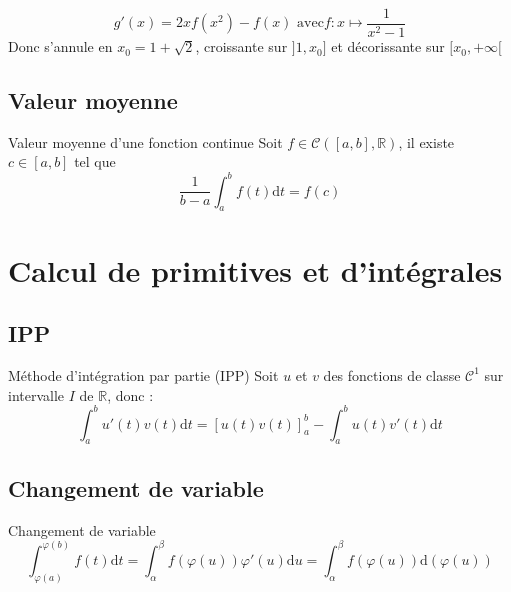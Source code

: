 \begin{myproof}{}{}
\begin{equation}
  g'(x) = 2x f(x ^{2}) - f(x) \text{ avec} f : x \mapsto \frac{1}{x ^{2} - 1} 
\end{equation}
Donc s'annule en $x_0 = 1 + \sqrt{2}$, croissante sur $]1, x_0]$ et décorissante sur $[x_0, + \infty[$
\end{myproof}

\subsection{Valeur moyenne} %
\label{sub:Valeur moyenne}

\begin{Theorem}{Valeur moyenne d'une fonction continue}{}
  Soit $f \in \mathcal{C}([a,b], \mathbb{R})$, il existe $c \in [a,b]$ tel que 
  \begin{equation}
    \frac{1}{b-a}  \int_{a}^{b} f(t) \mathrm{d}t = f(c)
  \end{equation}
\end{Theorem}


\section{Calcul de primitives et d'intégrales} %
\label{sec:Calcul de primitives et d'intégrales}

\subsection{IPP} %
\label{sub:IPP}

\begin{Prop}{Méthode d'intégration par partie (IPP)}{}
Soit $u$ et $v$ des fonctions de classe $\mathcal{C} ^{1}$ sur intervalle $I$ de $\mathbb{R}$, donc :
\begin{equation}
  \int_{a}^{b} u'(t) v(t) \mathrm{d} t = [u(t)v(t)]_a ^{b} - \int_{a}^{b} u(t)v'(t) \mathrm{d}t
\end{equation}
\end{Prop}

\subsection{Changement de variable} %
\label{sub:Changement de variable}
\begin{Prop}{
    Changement de variable
  }{}
\begin{equation}
  \int_{\varphi(a)}^{\varphi(b)} f(t) \mathrm{d}t = \int_{\alpha}^{\beta} f(\varphi(u)) \varphi'(u) \mathrm{d}u = \int_{\alpha
  }^{\beta} f(\varphi(u)) \mathrm{d}(\varphi(u))
\end{equation}
\end{Prop}


